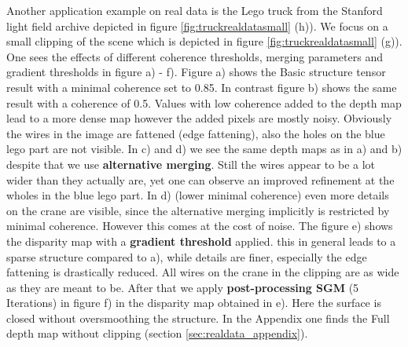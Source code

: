 \documentclass  [
  paper    = a4,
  BCOR     = 10mm,
  twoside,
  fontsize = 12pt,
  fleqn,
  toc      = bibnumbered,
  toc      = listofnumbered,
  numbers  = noendperiod,
  headings = normal,
  listof   = leveldown,
  version  = 3.03
]                                       {scrreprt}
\begin{document}
Another application example on real data is the Lego truck from the Stanford light field archive depicted in figure \ref{fig:truckrealdatasmall} (h)). We focus on a small clipping of the scene which is depicted in figure \ref{fig:truckrealdatasmall} (g)). One sees the effects of different coherence thresholds, merging parameters and gradient thresholds in figure a) - f). Figure a) shows the Basic structure tensor result with a minimal coherence set to 0.85. In contrast figure b) shows the same result with a coherence of 0.5. Values with low coherence added to the depth map lead to a more dense map however the added pixels are mostly noisy. Obviously the wires in the image are fattened (edge fattening), also the holes on the blue lego part are not visible. In c) and d) we see the same depth maps as in a) and b) despite that we use \textbf{alternative merging}. Still the wires appear to be a lot wider than they actually are, yet one can observe an improved refinement at the wholes in the blue lego part. In d) (lower minimal coherence) even more details on the crane are visible, since the alternative merging implicitly is restricted by minimal coherence. However this comes at the cost of noise. The figure e) shows the disparity map with a \textbf{gradient threshold} applied. this in general leads to a sparse structure compared to a), while details are finer, especially the edge fattening is drastically reduced. All wires on the crane in the clipping are as wide as they are meant to be. After that we  apply \textbf{post-processing SGM} (5 Iterations) in figure f) in the disparity map obtained in e). Here the surface is closed without oversmoothing the structure. In the Appendix one finds the Full depth map without clipping (section \ref{sec:realdata_appendix}).
\end{document}
